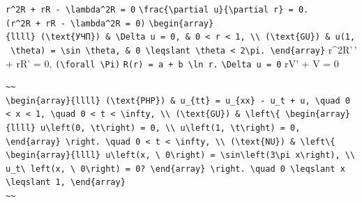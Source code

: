 \documentclass[
  ukrainian,
]{article}
\begin{document}
\texttt{r\^{}2R\textquotesingle{}\textquotesingle{}\ +\ rR\textquotesingle{}\ -\ \textbackslash{}lambda\^{}2R\ =\ 0}
\texttt{\textbackslash{}frac\{\textbackslash{}partial\ u\}\{\textbackslash{}partial\ r\}\ =\ 0.}
\texttt{(r\^{}2R\textquotesingle{}\textquotesingle{}\ +\ rR\textquotesingle{}\ -\ \textbackslash{}lambda\^{}2R\ =\ 0)}
\texttt{\textbackslash{}begin\{array\}\{llll\}\ (\textbackslash{}text\{УЧП\})\ \&\ \textbackslash{}Delta\ u\ =\ 0,\ \&\ 0\ \textless{}\ r\ \textless{}\ 1,\ \textbackslash{}\textbackslash{}\ (\textbackslash{}text\{GU\})\ \&\ u(1,\ \textbackslash{}theta)\ =\ \textbackslash{}sin\ \textbackslash{}theta,\ \&\ 0\ \textbackslash{}leqslant\ \textbackslash{}theta\ \textless{}\ 2\textbackslash{}pi.\ \textbackslash{}end\{array\}}
r\^{}2R'\,' + rR' = 0,
\texttt{(\textbackslash{}forall\ \textbackslash{}Pi)}
\texttt{R(r)\ =\ a\ +\ b\ \textbackslash{}ln\ r.}
\texttt{\textbackslash{}Delta\ u\ =\ 0} rV' + V = 0

\begin{verbatim}
~~
\begin{array}{llll} (\text{PHP}) & u_{tt} = u_{xx} - u_t + u, \quad 0 < x < 1, \quad 0 < t < \infty, \\ (\text{GU}) & \left\{ \begin{array}{llll} u\left(0, \t\right) = 0, \\ u\left(1, \t\right) = 0, \end{array} \right. \quad 0 < t < \infty, \\ (\text{NU}) & \left\{ \begin{array}{llll} u\left(x, \ 0\right) = \sin\left(3\pi x\right), \\ u_t\ left(x, \ 0\right) = 0? \end{array} \right. \quad 0 \leqslant x \leqslant 1, \end{array}
~~
\end{verbatim}
\end{document}
